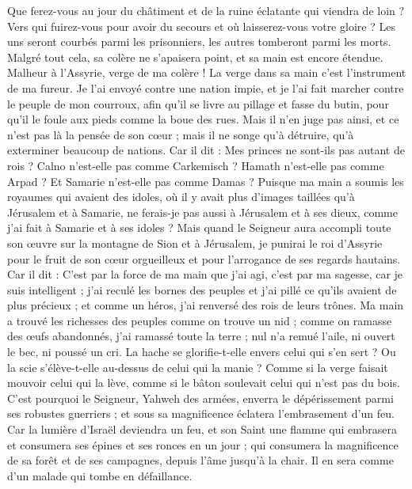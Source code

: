 \begin{multicols}{2}
Que ferez-vous au jour du châtiment et de la ruine éclatante qui viendra de loin ? Vers qui fuirez-vous pour avoir du secours et où laisserez-vous votre gloire ?
Les uns seront courbés parmi les prisonniers, les autres tomberont parmi les morts. Malgré tout cela, sa colère ne s'apaisera point, et sa main est encore étendue.
Malheur à l'Assyrie, verge de ma colère ! La verge dans sa main c'est l'instrument de ma fureur.
Je l'ai envoyé contre une nation impie, et je l'ai fait marcher contre le peuple de mon courroux, afin qu'il se livre au pillage et fasse du butin, pour qu'il le foule aux pieds comme la boue des rues.
Mais il n'en juge pas ainsi, et ce n'est pas là la pensée de son cœur ; mais il ne songe qu'à détruire, qu'à exterminer beaucoup de nations.
Car il dit : Mes princes ne sont-ils pas autant de rois ?
Calno n'est-elle pas comme Carkemisch ? Hamath n'est-elle pas comme Arpad ? Et Samarie n'est-elle pas comme Damas ?
Puisque ma main a soumis les royaumes qui avaient des idoles, où il y avait plus d'images taillées qu'à Jérusalem et à Samarie,
ne ferais-je pas aussi à Jérusalem et à ses dieux, comme j'ai fait à Samarie et à ses idoles ?
Mais quand le Seigneur aura accompli toute son œuvre sur la montagne de Sion et à Jérusalem, je punirai le roi d'Assyrie pour le fruit de son cœur orgueilleux et pour l'arrogance de ses regards hautains.
Car il dit : C'est par la force de ma main que j'ai agi, c'est par ma sagesse, car je suis intelligent ; j'ai reculé les bornes des peuples et j'ai pillé ce qu'ils avaient de plus précieux ; et comme un héros, j'ai renversé des rois de leurs trônes.
Ma main a trouvé les richesses des peuples comme on trouve un nid ; comme on ramasse des œufs abandonnés, j'ai ramassé toute la terre ; nul n'a remué l'aile, ni ouvert le bec, ni poussé un cri.
La hache se glorifie-t-elle envers celui qui s'en sert ? Ou la scie s'élève-t-elle au-dessus de celui qui la manie ? Comme si la verge faisait mouvoir celui qui la lève, comme si le bâton soulevait celui qui n'est pas du bois.
C'est pourquoi le Seigneur, Yahweh des armées, enverra le dépérissement parmi ses robustes guerriers ; et sous sa magnificence éclatera l'embrasement d'un feu.
Car la lumière d'Israël deviendra un feu, et son Saint une flamme qui embrasera et consumera ses épines et ses ronces en un jour ;
qui consumera la magnificence de sa forêt et de ses campagnes, depuis l'âme jusqu'à la chair. Il en sera comme d'un malade qui tombe en défaillance.

\end{multicols}
